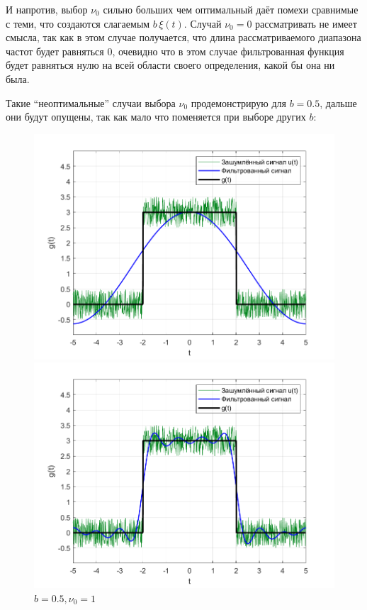 \documentclass[a4paper]{article}
\begin{document}
И напротив, выбор $\nu_0$ сильно больших чем оптимальный даёт помехи сравнимые с теми, что создаются слагаемым $b \, \xi(t)$. Случай $\nu_0 = 0$ рассматривать не имеет смысла, так как в этом случае получается, что длина рассматриваемого диапазона частот будет равняться $0$, очевидно что в этом случае фильтрованная функция будет равняться нулю на всей области своего определения, какой бы она ни была.\ 

Такие ``неоптимальные'' случаи выбора $\nu_0$ продемонстрирую для $b = 0.5$, дальше они будут опущены, так как мало что поменяется при выборе других $b$:

\begin{figure}[H]
    \begin{minipage}{0.5\textwidth}
        \centering
        \includegraphics[width=\textwidth]{part1/0.5_0.1.png}
        \caption{$b=0.5, \nu_0 = 0.1$}
    \end{minipage}    
    \begin{minipage}{0.5\textwidth}
        \centering
        \includegraphics[width=\textwidth]{part1/0.5_1.png}
        \caption{$b=0.5, \nu_0 = 1$}
    \end{minipage}
\end{figure}\ 
\end{document}
